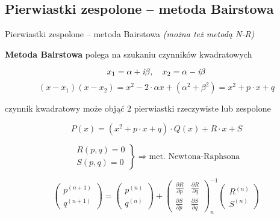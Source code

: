 \subsection{Pierwiastki zespolone -- metoda Bairstowa}

\begin{frame}{Pierwiastki zespolone -- metoda Bairstowa}
  \textit{(można też metodą N-R)}

  \vspace{5px}

  \textbf{Metoda Bairstowa} polega na szukaniu czynników kwadratowych

  $$x_1 = \alpha + \textit{\textrm{i}}\beta, \quad x_2 = \alpha - \textit{\textrm{i}}\beta$$
  $$(x - x_1)(x - x_2) = x^2 - 2 \cdot \alpha x + (\alpha^2 + \beta^2) = x^2 + p \cdot x + q$$

  czynnik kwadratowy może objąć 2 pierwiastki rzeczywiste lub zespolone

  \begin{equation}
    P(x) = (x^2 + p \cdot x + q) \cdot Q(x) + R \cdot x + S \label{bairstow}
  \end{equation}
\end{frame}

\begin{frame}
  $$\left. \begin{array}{l}
  R(p,q)=0 \\ S(p,q)=0
  \end{array}\right\} \Rightarrow \text{met. Newtona-Raphsona}$$

  \vspace{5mm}

  $$\left( \begin{array}{l}
  p^{(n+1)} \\ q^{(n+1)}
  \end{array} \right)
  =
  \left( \begin{array}{l}
  p^{(n)} \\ q^{(n)}
  \end{array} \right)
  +
  \left( \begin{array}{ll}
  \frac{{\partial}R}{{\partial}p} & \frac{{\partial}R}{{\partial}q} \\
  \frac{{\partial}S}{{\partial}p} & \frac{{\partial}S}{{\partial}q}
  \end{array} \right)_n^{-1}
  \left( \begin{array}{l}
  R^{(n)} \\ S^{(n)}
  \end{array} \right)$$
\end{frame}

